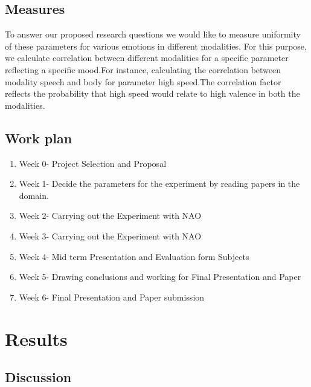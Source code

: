 \documentclass[runningheads]{llncs}
\begin{document}
\subsection{ Measures}
To answer our proposed research questions we would like to measure uniformity of these parameters for various emotions in different modalities. For this purpose, we calculate correlation between different modalities for a specific parameter reflecting a specific mood.For instance, calculating the correlation between modality speech and body for parameter high speed.The correlation factor reflects the probability that high speed would relate to high valence in both the modalities.

\subsection{Work plan}
\begin{enumerate}
\item Week 0- Project Selection and Proposal
    \item Week 1- Decide the parameters for the experiment by reading papers in the domain.
    \item Week 2- Carrying out the Experiment with NAO 
    \item Week 3- Carrying out the Experiment with NAO
    \item Week 4- Mid term Presentation and Evaluation form Subjects
    \item Week 5- Drawing conclusions and working for Final Presentation and Paper
   \item Week 6- Final Presentation and Paper submission 
\end{enumerate}
\section{Results}



\subsection{ Discussion}
\end{document}
